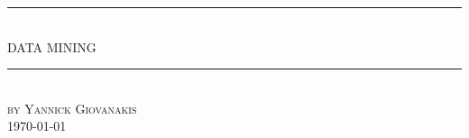 \documentclass[12pt]{article} %
\begin{document}

\begin{titlepage}

\newcommand{\HRule}{\rule{\linewidth}{0.5mm}} %

\center %
\HRule \\[0.5cm]
{ \LARGE  DATA MINING}\\[0.8cm] %
\HRule \\[1.5cm]
\textsc{\large by Yannick Giovanakis}\\[5.5cm] %

\vfill
{\large \today}\\[3cm] %
\end{titlepage}


\tableofcontents %

\newpage %
\end{document}
